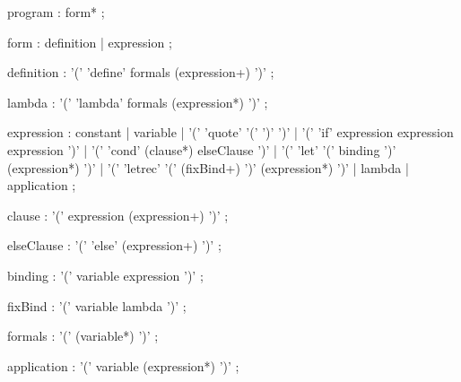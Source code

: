 \begin{rail}
  program : form* ;

  form : definition | expression ;

  definition : '(' 'define' formals (expression+) ')' ;

  lambda : '(' 'lambda' formals (expression*) ')' ;

  expression : constant
  | variable
  | '(' 'quote' '(' ')' ')'
  | '(' 'if' expression expression expression ')'
  | '(' 'cond' (clause*) elseClause ')'
  | '(' 'let' '(' binding ')' (expression*) ')'
  | '(' 'letrec' '(' (fixBind+) ')' (expression*) ')'
  | lambda
  | application ;

  clause : '(' expression (expression+) ')' ;

  elseClause :  '(' 'else' (expression+) ')' ;

  binding : '(' variable expression ')' ;

  fixBind : '(' variable lambda ')' ;

  formals : '(' (variable*) ')' ;

  application : '(' variable (expression*) ')' ;

\end{rail}
